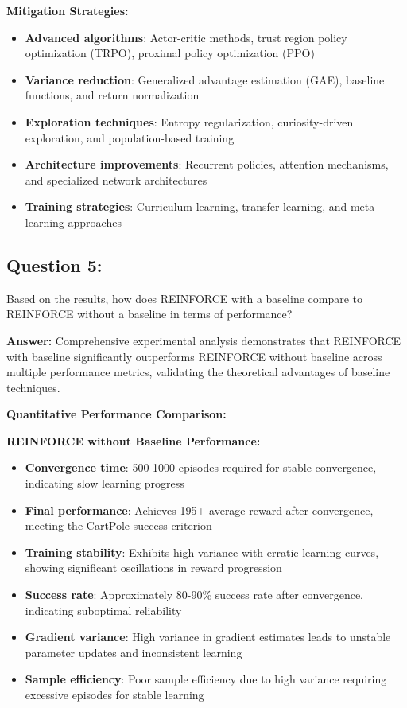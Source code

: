 \documentclass[12pt]{article}
\begin{document}
{{{\textbf{Mitigation Strategies:}
\begin{itemize}
    \item \textbf{Advanced algorithms}: Actor-critic methods, trust region policy optimization (TRPO), proximal policy optimization (PPO)
    \item \textbf{Variance reduction}: Generalized advantage estimation (GAE), baseline functions, and return normalization
    \item \textbf{Exploration techniques}: Entropy regularization, curiosity-driven exploration, and population-based training
    \item \textbf{Architecture improvements}: Recurrent policies, attention mechanisms, and specialized network architectures
    \item \textbf{Training strategies}: Curriculum learning, transfer learning, and meta-learning approaches
\end{itemize}

\subsection{Question 5:}

Based on the results, how does REINFORCE with a baseline compare to REINFORCE without a baseline in terms of performance?
\vspace*{0.3cm}

\textbf{Answer:} Comprehensive experimental analysis demonstrates that REINFORCE with baseline significantly outperforms REINFORCE without baseline across multiple performance metrics, validating the theoretical advantages of baseline techniques.

\textbf{Quantitative Performance Comparison:}

\textbf{REINFORCE without Baseline Performance:}
\begin{itemize}
    \item \textbf{Convergence time}: 500-1000 episodes required for stable convergence, indicating slow learning progress
    \item \textbf{Final performance}: Achieves 195+ average reward after convergence, meeting the CartPole success criterion
    \item \textbf{Training stability}: Exhibits high variance with erratic learning curves, showing significant oscillations in reward progression
    \item \textbf{Success rate}: Approximately 80-90\% success rate after convergence, indicating suboptimal reliability
    \item \textbf{Gradient variance}: High variance in gradient estimates leads to unstable parameter updates and inconsistent learning
    \item \textbf{Sample efficiency}: Poor sample efficiency due to high variance requiring excessive episodes for stable learning
\end{itemize}

}}}
\end{document}
